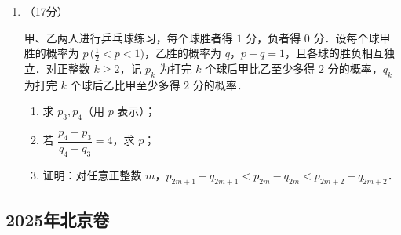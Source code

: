 \begin{description}
\begin{enumerate}[leftmargin=5pt]
        \begin{enumerate}[label=(\arabic*)]
            \item 证明：$f(x)$ 在区间 $(0,+\infty)$ 存在唯一的极值点和唯一的零点；
            \item 设 $x_1,x_2$ 分别为 $f(x)$ 在区间 $(0,+\infty)$ 的极值点和零点．
            \begin{enumerate}[label=(\roman*)]
                \item 设函数 $g(t)=f(x_1+t)-f(x_1-t)$，证明：$g(t)$ 在区间 $(0,x_1)$ 单调递减；
                \item 比较 $2x_1$ 与 $x_2$ 的大小，并证明你的结论．
            \end{enumerate}
        \end{enumerate}

        \item （17分）

        甲、乙两人进行乒乓球练习，每个球胜者得 $1$ 分，负者得 $0$ 分．设每个球甲胜的概率为 $p\,\bigl(\frac{1}{2}<p<1\bigr)$，乙胜的概率为 $q$，$p+q=1$，且各球的胜负相互独立．对正整数 $k\geqslant2$，记 $p_k$ 为打完 $k$ 个球后甲比乙至少多得 $2$ 分的概率，$q_k$ 为打完 $k$ 个球后乙比甲至少多得 $2$ 分的概率．

        \begin{enumerate}[label=(\arabic*)]
            \item 求 $p_3,p_4$（用 $p$ 表示）；
            \item 若 $\dfrac{p_4-p_3}{q_4-q_3}=4$，求 $p$；
            \item 证明：对任意正整数 $m$，$p_{2m+1}-q_{2m+1}<p_{2m}-q_{2m}<p_{2m+2}-q_{2m+2}$．
        \end{enumerate}
    \end{enumerate}
\end{description}

\clearpage


\subsection{2025年北京卷}\label{gk:2025年北京卷}

